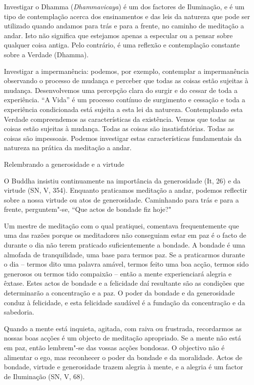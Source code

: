 Investigar o Dhamma (\emph{Dhammavicaya}) é um dos factores de
Iluminação, e é um tipo de contemplação acerca dos ensinamentos e das
leis da natureza que pode ser utilizado quando andamos para trás e para
a frente, no caminho de meditação a andar. Isto não significa que
estejamos apenas a especular ou a pensar sobre qualquer coisa antiga.
Pelo contrário, é uma reflexão e contemplação constante sobre a Verdade
(Dhamma).

Investigar a impermanência: podemos, por exemplo, contemplar a
impermanência observando o processo de mudança e perceber que todas as
coisas estão sujeitas à mudança. Desenvolvemos uma percepção clara do
surgir e do cessar de toda a experiência. ``A Vida'' é um processo
contínuo de surgimento e cessação e toda a experiência condicionada está
sujeita a esta lei da natureza. Contemplando esta Verdade compreendemos
as características da existência. Vemos que todas as coisas estão
sujeitas à mudança. Todas as coisas são insatisfatórias. Todas as coisas
são impessoais. Podemos investigar estas características fundamentais da
natureza na prática da meditação a andar.

\begin{siderule-quote}
  Relembrando a generosidade e a virtude
\end{siderule-quote}

O Buddha insistiu continuamente na importância da generosidade (It, 26)
e da virtude (SN, V, 354). Enquanto praticamos meditação a andar,
podemos reflectir sobre a nossa virtude ou atos de generosidade.
Caminhando para trás e para a frente, perguntem"-se, ``Que actos de bondade
fiz hoje?"

Um mestre de meditação com o qual pratiquei, comentava frequentemente
que uma das razões porque os meditadores não conseguiam estar em paz é o
facto de durante o dia não terem praticado suficientemente a bondade. A
bondade é uma almofada de tranquilidade, uma base para termos paz. Se a
praticarmos durante o dia -- termos dito uma palavra amável, termos
feito uma boa acção, termos sido generosos ou termos tido compaixão --
então a mente experienciará alegria e êxtase. Estes actos de bondade e a
felicidade daí resultante são as condições que determinarão a
concentração e a paz. O poder da bondade e da generosidade conduz à
felicidade, e esta felicidade saudável é a fundação da concentração e da
sabedoria.

Quando a mente está inquieta, agitada, com raiva ou frustrada,
recordarmos as nossas boas acções é um objecto de meditação apropriado. Se
a mente não está em paz, então lembrem"-se das vossas acções bondosas. O
objectivo não é alimentar o ego, mas reconhecer o poder da bondade e da
moralidade. Actos de bondade, virtude e generosidade trazem alegria à
mente, e a alegria é um factor de Iluminação (SN, V, 68).


